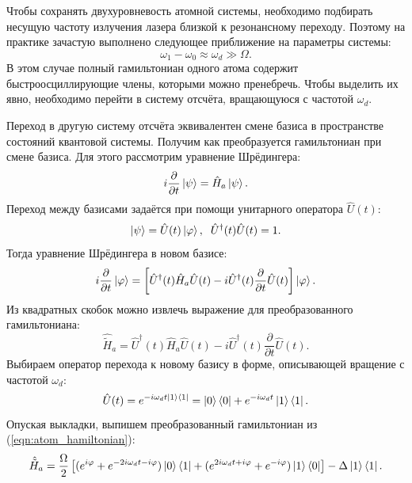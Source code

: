 Чтобы сохранять двухуровневость атомной системы, необходимо подбирать несущую частоту излучения лазера близкой к резонансному переходу.
Поэтому на практике зачастую выполнено следующее приближение на параметры системы:
\begin{equation} \label{eqn:rot_wave_assumption}
    \omega_1 - \omega_0 \approx \omega_d \gg \Omega.
\end{equation}
В этом случае полный гамильтониан одного атома содержит быстроосциллирующие члены, которыми можно пренебречь. 
Чтобы выделить их явно, необходимо перейти в систему отсчёта, вращающуюся с частотой $\omega_d$. 

Переход в другую систему отсчёта эквивалентен смене базиса в пространстве состояний квантовой системы.
Получим как преобразуется гамильтониан при смене базиса. Для этого рассмотрим уравнение Шрёдингера:
\begin{equation}
    i \frac{\partial}{\partial t} \ket{\psi} = \hat{H}_a \ket{\psi}.
\end{equation}
Переход между базисами задаётся при помощи унитарного оператора $\hat{U}(t)$: 
\begin{equation}
    \ket{\psi} = \hat{U} (t) \ket{\varphi}, \hspace{2mm} \hat{U}^{\dagger}(t) \hat{U}(t) = 1. 
\end{equation}
Тогда уравнение Шрёдингера в новом базисе:
\begin{equation}
    i \frac{\partial}{\partial t} \ket{\varphi} = \left[\hat{U}^{\dagger}(t) \hat{H}_a\hat{U}(t) - i \hat{U}^{\dagger}(t)\frac{\partial}{\partial t}\hat{U}(t) \right] \ket{\varphi}.
\end{equation}
Из квадратных скобок можно извлечь выражение для преобразованного гамильтониана:
\begin{equation}
    \hat{\tilde{H}}_a = \hat{U}^{\dagger}(t) \hat{H}_a \hat{U}(t) - i \hat{U}^{\dagger}(t)\frac{\partial}{\partial t}\hat{U}(t).
\end{equation}
Выбираем оператор перехода к новому базису в форме, описывающей вращение с частотой $\omega_d$:
\begin{equation}
    \hat{U}(t) = e^{-i \omega_d t \ket{1} \bra{1} } = \ket{0} \bra{0} + e^{-i \omega_d t} \ket{1} \bra{1}.
\end{equation}
Опуская выкладки, выпишем преобразованный гамильтониан из (\ref{eqn:atom_hamiltonian}):
\begin{equation}
    \hat{\tilde{H}}_a = \frac{\Omega}{2}\left[(e^{i \varphi} + e^{-2 i \omega_d t - i \varphi} )\ket{0} \bra{1} + (e^{2 i \omega_d t + i \varphi} + e^{-i \varphi}) \ket{1} \bra{0} \right] - \Delta \ket{1} \bra{1}.
\end{equation}
